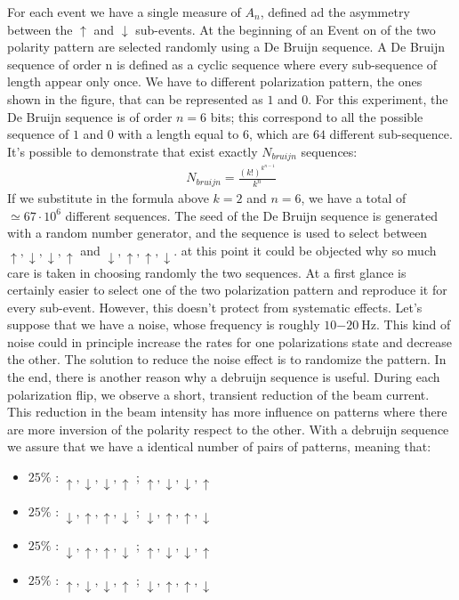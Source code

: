 For each event we have a single measure of $A_{n}$, defined ad the asymmetry between the $\uparrow$ and $\downarrow$ sub-events.
At the beginning of an Event on of the two polarity pattern are selected randomly using a De Bruijn sequence. A De Bruijn sequence of order n is defined as a cyclic sequence where every sub-sequence of length appear only once. We have to different polarization pattern, the ones shown in the figure, that can be represented as $1$ and $0$. For this experiment, the De Bruijn sequence is of order $n = 6$ bits; this correspond to all the possible sequence of $1$ and $0$ with a length equal to $6$, which are $64$ different sub-sequence.
It's possible to demonstrate that exist exactly $N_{bruijn}$ sequences: 
\begin{align*}
N_{bruijn} = \frac{(k!)^{k^{n-1}}}{k^{n}}
\end{align*}
If we substitute in the formula above $k=2$ and $n = 6$, we have a total of $\simeq 67 \cdot 10^{6}$ different sequences. The seed of the De Bruijn sequence is generated with a random number generator, and the sequence is used to select between $\uparrow,\downarrow,\downarrow, \uparrow$  and $\downarrow,\uparrow,\uparrow,\downarrow$. at this point it could be objected why so much care is taken in choosing randomly the two sequences. At a first glance is certainly easier to select one of the two polarization pattern and reproduce it for every sub-event. However, this doesn't protect from systematic effects.
Let's suppose that we have a noise, whose frequency is roughly $\SI{10-20}{\hertz}$. This kind of noise could in principle increase the rates for one polarizations state and decrease the other. The solution to reduce the noise effect is to randomize the pattern. 
In the end, there is another reason why a debruijn sequence is useful. During each polarization flip, we observe a short, transient reduction of the beam current. This reduction in the beam intensity has more influence on patterns where there are more inversion of the polarity respect to the other. With a debruijn sequence we assure that we have a identical number of pairs of patterns, meaning that:

\begin{itemize}
\item $25\%$ : $\uparrow,\downarrow,\downarrow, \uparrow$ ; $\uparrow,\downarrow,\downarrow, \uparrow$
\item $25\%$ : $\downarrow,\uparrow, \uparrow,\downarrow$ ; $\downarrow,\uparrow, \uparrow,\downarrow$
\item $25\%$ : $\downarrow,\uparrow, \uparrow,\downarrow$ ; $\uparrow,\downarrow,\downarrow, \uparrow$
\item $25\%$ : $\uparrow,\downarrow,\downarrow, \uparrow$ ; $\downarrow,\uparrow, \uparrow,\downarrow$
\end{itemize}

